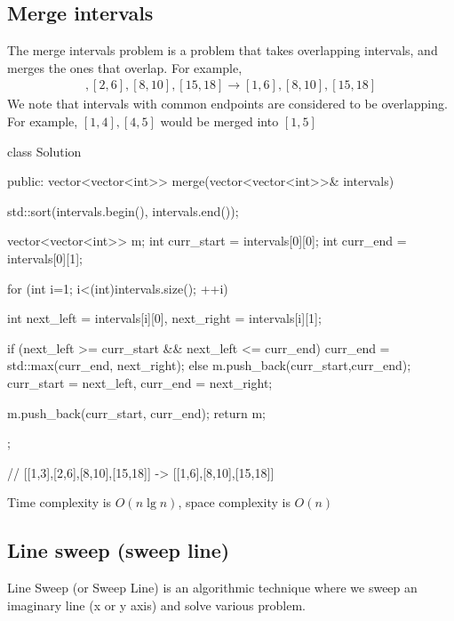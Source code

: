 \documentclass{report}
\begin{document}
    \bigbreak \noindent 
    \subsection{Merge intervals}
    \bigbreak \noindent 
    The merge intervals problem is a problem that takes overlapping intervals, and merges the ones that overlap. For example,
    \begin{align*}
        [1,3], [2,6], [8,10], [15,18] \to [1,6], [8,10], [15,18]
    \end{align*}
    We note that intervals with common endpoints are considered to be overlapping. For example, $[1,4], [4,5]$ would be merged into $[1,5]$
    \bigbreak \noindent 
    \begin{cppcode}
        class Solution {
            public:
            vector<vector<int>> merge(vector<vector<int>>& intervals) {
                std::sort(intervals.begin(), intervals.end());

                vector<vector<int>> m;
                int curr_start = intervals[0][0];
                int curr_end = intervals[0][1];

                for (int i=1; i<(int)intervals.size(); ++i) {
                    int next_left = intervals[i][0], next_right = intervals[i][1];

                if (next_left >= curr_start && next_left <= curr_end) {
                    curr_end = std::max(curr_end, next_right);
                } else {
                    m.push_back({curr_start,curr_end});
                    curr_start = next_left, curr_end = next_right;
                }
            }
            m.push_back({curr_start, curr_end});
            return m;
        }
    };

    // [[1,3],[2,6],[8,10],[15,18]] -> [[1,6],[8,10],[15,18]]
\end{cppcode}
\bigbreak \noindent 
Time complexity is $O(n\lg n)$, space complexity is $O(n)$

\pagebreak 
\subsection{Line sweep (sweep line)}
\bigbreak \noindent 
Line Sweep (or Sweep Line) is an algorithmic technique where we sweep an imaginary line (x or y axis) and solve various problem.
\bigbreak \noindent 
\end{document}

